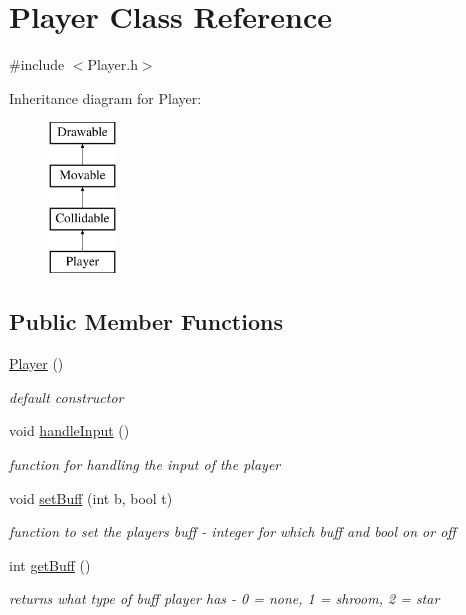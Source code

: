 \hypertarget{class_player}{\section{Player Class Reference}
\label{class_player}
}


{\ttfamily \#include $<$Player.\-h$>$}

Inheritance diagram for Player\-:\begin{figure}[H]
\begin{center}
\leavevmode
\includegraphics[height=4.000000cm]{class_player}
\end{center}
\end{figure}
\subsection*{Public Member Functions}
\begin{DoxyCompactItemize}
\item 
\hyperlink{class_player_affe0cc3cb714f6deb4e62f0c0d3f1fd8}{Player} ()
\begin{DoxyCompactList}\small\item\em default constructor \end{DoxyCompactList}\item 
void \hyperlink{class_player_a3c2e7e40fe2018229d44168bd484c182}{handle\-Input} ()
\begin{DoxyCompactList}\small\item\em function for handling the input of the player \end{DoxyCompactList}\item 
\hypertarget{class_player_a12121c992641a4f456e5546b735c070e}{void \hyperlink{class_player_a12121c992641a4f456e5546b735c070e}{set\-Buff} (int b, bool t)}\label{class_player_a12121c992641a4f456e5546b735c070e}

\begin{DoxyCompactList}\small\item\em function to set the players buff -\/ integer for which buff and bool on or off \end{DoxyCompactList}\item 
\hypertarget{class_player_af4ff40310af95ecbd9ba06b2108793a3}{int \hyperlink{class_player_af4ff40310af95ecbd9ba06b2108793a3}{get\-Buff} ()}\label{class_player_af4ff40310af95ecbd9ba06b2108793a3}

\begin{DoxyCompactList}\small\item\em returns what type of buff player has -\/ 0 = none, 1 = shroom, 2 = star \end{DoxyCompactList}\end{DoxyCompactItemize}
